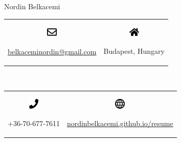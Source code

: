 \documentclass{article}
\begin{document}
\begin{center}
    {\Large{Nordin Belkacemi}} \\
    \vspace{3mm}
    \begin{tabular}{c c}
        \begin{minipage}[c]{5mm}
            \includegraphics[width=5mm]{../images/envelope-regular.pdf}
        \end{minipage}
        \begin{minipage}[c]{50mm}
            \href{mailto:belkaceminordin@gmail.com}{belkaceminordin@gmail.com}
        \end{minipage} &
        \begin{minipage}[c]{5mm}
            \includegraphics[width=5mm]{../images/home-solid.pdf}
        \end{minipage}
        \begin{minipage}[c]{50mm}
            Budapest, Hungary
        \end{minipage}
    \end{tabular} \\
    \vspace{1mm}
    \begin{tabular}{c c}
        \begin{minipage}[c]{5mm}
            \includegraphics[width=5mm]{../images/phone-solid.pdf}
        \end{minipage}
        \begin{minipage}[c]{50mm}
            +36-70-677-7611
        \end{minipage} &
        \vspace{2mm} 
        \begin{minipage}[c]{5mm}
            \includegraphics[width=5mm]{../images/world-wide-web.pdf}
        \end{minipage}
        \begin{minipage}[c]{50mm}
            \href{https://nordinbelkacemi.github.io/resume}{nordinbelkacemi.github.io/resume}
        \end{minipage}
    \end{tabular}
\end{center}
\end{document}
